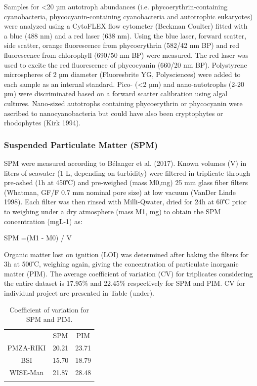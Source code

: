 \documentclass[essd, manuscript]{copernicus}
\begin{document}
Samples for <20 µm autotroph abundances (i.e. phycoerythrin-containing cyanobacteria, phycocyanin-containing cyanobacteria and autotrophic eukaryotes) were analyzed using a CytoFLEX flow cytometer (Beckman Coulter) fitted with a blue (488 nm) and a red laser (638 nm). Using the blue laser, forward scatter, side scatter, orange fluorescence from phycoerythrin (582/42 nm BP) and red fluorescence from chlorophyll (690/50 nm BP) were measured. The red laser was used to excite the red fluorescence of phycocyanin (660/20 nm BP). Polystyrene microspheres of 2 µm diameter (Fluoresbrite YG, Polysciences) were added to each sample as an internal standard. Pico- (<2 µm) and nano-autotrophs (2-20 µm) were discriminated based on a forward scatter calibration using algal cultures. Nano-sized autotrophs containing phycoerythrin or phycocyanin were ascribed to nanocyanobacteria but could have also been cryptophytes or rhodophytes (Kirk 1994).

\subsubsection{Suspended Particulate Matter (SPM)}
SPM were measured according to Bélanger et al. (2017). Known volumes (V) in liters of seawater (1 L, depending on turbidity) were filtered in triplicate through pre-ashed (1h at 450℃) and pre-weighed (mass M0,mg) 25 mm glass fiber filters (Whatman, GF/F 0.7 mm nominal pore size) at low vacuum (VanDer Linde 1998). Each filter was then rinsed with Milli-Qwater, dried for 24h at 60℃ prior to weighing under a dry atmosphere (mass M1, mg) to obtain the SPM concentration (mgL-1) as:

SPM =(M1 - M0) / V

Organic matter lost on ignition (LOI) was determined after baking the filters for 3h at 500℃, weighing again, giving the concentration of particulate inorganic matter (PIM).
The average coefficient of variation (CV) for triplicates considering the entire dataset is 17.95\% and 22.45\% respectively for SPM and PIM. CV for individual project are presented in Table (under).

\begin{table}[t]
\caption{Coefficient of variation for SPM and PIM.}
\centering
\begin{tabular}{ c|cc  }
\tophline
 & SPM & PIM\\
\middlehline
PMZA-RIKI & 20.21 & 23.71 \\
BSI & 15.70 & 18.79 \\
WISE-Man & 21.87 & 28.48 \\
\bottomhline
 \end{tabular}
 \label{table:SPMCV}
\end{table}
\end{document}
